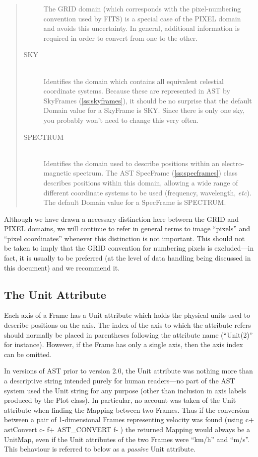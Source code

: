 \documentclass[twoside,11pt]{article}
\newcommand{\secref}[1]{\S\ref{#1}}
\renewcommand{\secref}[1]{\ref{#1}}
\begin{document}
\begin{quote}
\begin{description}
The GRID domain (which corresponds with the pixel-numbering convention
used by FITS) is a special case of the PIXEL domain and avoids this
uncertainty. In general, additional information is required in order
to convert from one to the other.

\item[SKY]\mbox{}\\
Identifies the domain which contains all equivalent celestial
coordinate systems. Because these are represented in AST by SkyFrames
(\secref{ss:skyframes}), it should be no surprise that the default
Domain value for a SkyFrame is SKY. Since there is only one sky, you
probably won't need to change this very often.

\item[SPECTRUM]\mbox{}\\
Identifies the domain used to describe positions within an
electro-magnetic spectrum. The AST SpecFrame (\secref{ss:specframes})
class describes positions within this domain, allowing a wide range of
different coordinate systems to be used (frequency, wavelength,
{\em{etc}}). The default Domain value for a SpecFrame is SPECTRUM.

\end{description}
\end{quote}

Although we have drawn a necessary distinction here between the GRID
and PIXEL domains, we will continue to refer in general terms to image
``pixels'' and ``pixel coordinates'' whenever this distinction is not
important. This should not be taken to imply that the GRID convention
for numbering pixels is excluded---in fact, it is usually to be
preferred (at the level of data handling being discussed in this
document) and we recommend it.

\subsection{\label{ss:frameunits}The Unit Attribute}
Each axis of a Frame has a Unit attribute which holds the physical units used
to describe positions on the axis. The index of the axis to which the 
attribute refers should normally be placed in parentheses following the
attribute name (``Unit(2)'' for instance). However, if the Frame has only
a single axis, then the axis index can be omitted.

In versions of AST prior to version 2.0, the Unit attribute was nothing
more than a descriptive string intended purely for human readers---no
part of the AST system used the Unit string for any purpose (other than 
inclusion in axis labels produced by the Plot class). In particular, no
account was taken of the Unit attribute when finding the Mapping between
two Frames. Thus if the conversion between a pair of 1-dimensional Frames 
representing velocity was found (using
c+
astConvert
c-
f+
AST\_CONVERT
f-
) the returned Mapping would always be a UnitMap, even if the Unit
attributes of the two Frames were ``km/h'' and ``m/s''. This behaviour is
referred to below as a \emph{passive} Unit attribute.
\end{document}
